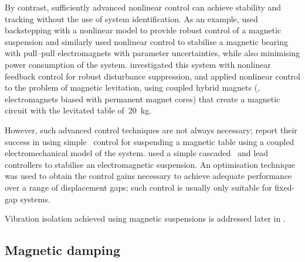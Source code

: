 \documentclass[11pt,a4paper]{memoir}
\begin{document}

By contrast, sufficiently advanced nonlinear control can achieve stability and tracking without the use of system identification.
As an example, \textcite{mahmoud2003} used backstepping with a nonlinear model to provide robust control of a magnetic suspension and \textcite{queiroz2007} similarly used nonlinear control to stabilise a magnetic bearing with pull--pull electromagnets with parameter uncertainties, while also minimising power consumption of the system.
\textcite{gentili2003} investigated this system with nonlinear feedback control for robust disturbance suppression, and
\textcite{chang2001} applied nonlinear control to the problem of magnetic levitation, using coupled hybrid magnets (\ie, electromagnets biased with permanent magnet cores) that create a magnetic circuit with the levitated table of~\SI{20}{kg}.

However, such advanced control techniques are not always necessary; \textcite{li2007} report their success in using simple \PID\ control for suspending a magnetic table using a coupled electromechanical model of the system.
\textcite{banerjee2008} used a simple cascaded \PI\ and lead controllers to stabilise an electromagnetic suspension.
An optimisation technique was used to obtain the control gains necessary to achieve adequate performance over a range of displacement gaps; such control is usually only suitable for fixed-gap systems.

Vibration isolation achieved using magnetic suspensions is addressed later in .




\subsection{Magnetic damping}
\end{document}
